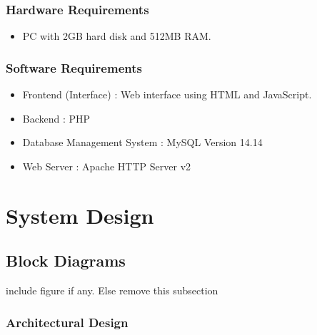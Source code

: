 \documentclass[11pt]{report}
\begin{document}
\subsection{Hardware Requirements}
\begin{itemize}
  \item PC with 2GB hard disk and 512MB RAM.
\end{itemize}

\subsection{Software Requirements}
\begin{itemize}
  \item Frontend (Interface) : Web interface using HTML and JavaScript.
  \item Backend : PHP
  \item Database Management System : MySQL Version 14.14
  \item Web Server : Apache HTTP Server v2
\end{itemize}

  

\chapter{System Design}
\label{xx}
 




\section{Block Diagrams} 
include figure if any. Else remove this subsection

\subsection{Architectural Design}
\end{document}
